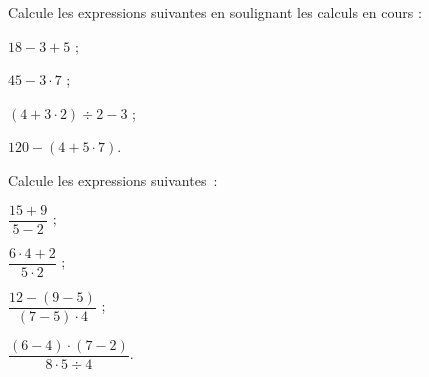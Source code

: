\begin{methode*1}
 \exercice 
Calcule les expressions suivantes en soulignant les calculs en cours :
\begin{colenumerate}{2}
 \item $18 - 3 + 5$ ;
 \item $45 - 3 \cdot 7$ ;
 \item $(4 + 3 \cdot 2) \div 2 - 3$ ;
 \item $120 - (4 + 5 \cdot 7)$.
 \end{colenumerate}

 \exercice 
Calcule les expressions suivantes :
\begin{colenumerate}{4}
\item $\dfrac{15 +9}{5 - 2}$ ;
\item $\dfrac{6 \cdot 4 + 2}{5 \cdot 2}$ ;
\item $\dfrac{12 - (9 - 5)}{(7- 5) \cdot 4}$ ;
\item $\dfrac{(6 - 4) \cdot (7 - 2)}{8 \cdot 5 \div 4}$.
 \end{colenumerate}

\end{methode*1}
